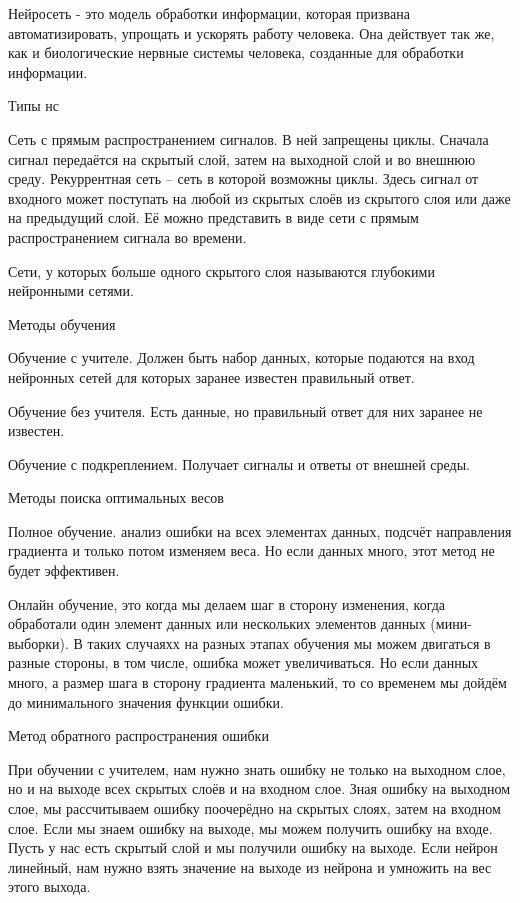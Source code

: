 \documentclass[12pt,a4paper]{report}
\begin{document}
Нейросеть  - это модель обработки информации, которая призвана автоматизировать, упрощать и ускорять работу человека. Она действует так же, как и биологические нервные системы человека, созданные для обработки информации. 

 Типы нс 

Сеть с прямым распространением сигналов. В ней запрещены циклы. Сначала сигнал передаётся на скрытый слой, затем на выходной слой и во внешнюю среду. Рекуррентная сеть – сеть в которой возможны циклы. Здесь сигнал от входного может поступать на любой из скрытых слоёв из скрытого слоя или даже на предыдущий слой. Её можно представить в виде сети с прямым распространением сигнала во времени. 

Сети, у которых больше одного скрытого слоя называются глубокими нейронными сетями. 

 Методы обучения 

Обучение с учителе. Должен быть набор данных, которые подаются на вход нейронных сетей для которых заранее известен правильный ответ.  

Обучение без учителя. Есть данные, но правильный ответ для них заранее не известен. 

Обучение с подкреплением. Получает сигналы и ответы от внешней среды. 

 Методы поиска оптимальных весов 

Полное обучение. анализ ошибки на всех элементах данных, подсчёт направления градиента и только потом изменяем веса. Но если данных много, этот метод не будет эффективен.  

Онлайн обучение, это когда мы делаем шаг в сторону изменения, когда обработали один элемент данных или нескольких элементов данных (мини-выборки). В таких случаяхх на разных этапах обучения мы можем двигаться в разные стороны, в том числе, ошибка может увеличиваться. Но если данных много, а размер шага в сторону градиента маленький, то со временем мы дойдём до минимального значения функции ошибки. 

 Метод обратного распространения ошибки 

При обучении с учителем, нам нужно знать ошибку не только на выходном слое, но и на выходе всех скрытых слоёв и на входном слое. Зная ошибку на выходном слое, мы рассчитываем ошибку поочерёдно на скрытых слоях, затем на входном слое. Если мы знаем ошибку на выходе, мы можем получить ошибку на входе. Пусть у нас есть скрытый слой и мы получили ошибку на выходе. Если нейрон линейный, нам нужно взять значение на выходе из нейрона и умножить на вес этого выхода.  
	
\end{document}
